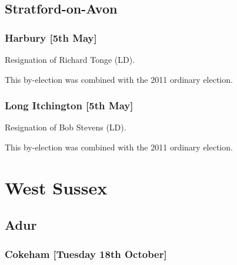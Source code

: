 \begin{resultsiii}
\subsection*{Stratford-on-Avon}

\subsubsection*{Harbury \hspace*{\fill}\nolinebreak[1]%
\enspace\hspace*{\fill}
[5th May]}


Resignation of Richard Tonge (LD).

This by-election was combined with the 2011 ordinary election.

\subsubsection*{Long Itchington \hspace*{\fill}\nolinebreak[1]%
\enspace\hspace*{\fill}
[5th May]}


Resignation of Bob Stevens (LD).

This by-election was combined with the 2011 ordinary election.

\section{West Sussex}

\subsection*{Adur}

\subsubsection*{Cokeham \hspace*{\fill}\nolinebreak[1]%
\enspace\hspace*{\fill}
[Tuesday 18th October]}


\end{resultsiii}
